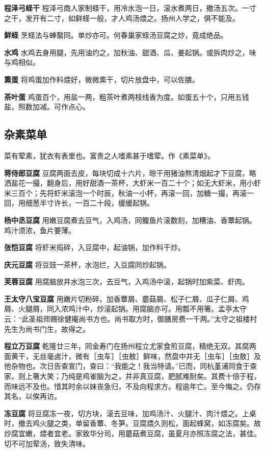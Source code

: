 \documentclass[]{article}
\begin{document}
\textbf{程泽弓蛏干}
程泽弓商人家制蛏干，用冷水泡一日，滚水煮两日，撤汤五次。一寸之干，发开有二寸，如鲜蛏一般，才人鸡汤煨之。扬州人学之，俱不能及。

\textbf{鲜蛏} 烹蛏法与蛼螯同。单炒亦可。何春巢家蛏汤豆腐之炒，竟成绝品。

\textbf{水鸡}
水鸡去身用腿，先用油灼之，加秋油、甜酒、瓜、姜起锅。或拆肉炒之，味与鸡相似。

\textbf{熏蛋} 将鸡蛋加作料煨好，微微熏干，切片放盘中，可以佐膳。

\textbf{茶叶蛋}
鸡蛋百个，用盐一两，粗茶叶煮两枝线香为度。如蛋五十个，只用五钱盐，照数加减。可作点心。

\hypertarget{header-n27}{%
\subsection{杂素菜单}\label{header-n27}}

菜有荤素，犹衣有表里也。富贵之人嗜素甚于嗜荤。作《素菜单》。

\textbf{蒋侍郎豆腐}
豆腐两面去皮，每块切成十六片，晾干用猪油熬清烟起才下豆腐，略洒盐花一撮，翻身后，用好甜酒一茶杯，大虾米一百二十个；如无大虾米，用小虾米三百个；先将虾米滚泡一个时辰，秋油一小杯，再滚一回，加糖一撮，再滚一回，用细葱半寸许长，一百二十段，缓缓起锅。

\textbf{杨中丞豆腐}
用嫩豆腐煮去豆气，入鸡汤，同鳆鱼片滚数刻，加糟油、香蕈起锅。鸡汁须浓，鱼片要薄。

\textbf{张恺豆腐} 将虾米捣碎，入豆腐中，起油锅，加作料干炒。

\textbf{庆元豆腐} 将豆豉一茶杯，水泡烂，入豆腐同炒起锅。

\textbf{芙蓉豆腐}
用腐脑放井水泡三次，去豆气，入鸡汤中滚，起锅时加紫菜、虾肉。

\textbf{王太守八宝豆腐}
用嫩片切粉碎，加香蕈屑、蘑菇屑、松子仁屑、瓜子仁屑、鸡屑、火腿屑，同入浓鸡汁中，炒滚起锅。用腐脑亦可。用瓢不用箸。孟亭太守云：``此圣祖师赐徐健庵尚书方也。尚书取方时，御膳房费一千两。''太守之祖楼村先生为尚书门生，故得之。

\textbf{程立万豆腐}
乾隆廿三年，同金寿门在扬州程立尤家食煎豆腐，精绝无双。其腐两面黄干，无丝毫卤汁，微有［虫车］［虫敖］鲜味，然盘中并无［虫车］［虫敖］及他杂物也。次日告查宣门，查曰：``我能之！我当特请。''已而，同杭堇浦同食于查家，则上箸大笑；乃纯是鸡雀脑为之，并非真豆腐，肥腻难耐矣。其费十倍于程，而味远不及也。惜其时余以妹丧急归，不及向程求方。程逾年亡。至今悔之。仍存其名，以俟再访。

\textbf{冻豆腐}
将豆腐冻一夜，切方块，滚去豆味，加鸡汤汁、火腿汁、肉汁煨之。上桌时，撤去鸡火腿之类，单留香蕈、冬笋。豆腐煨久则松，面起蜂窝，如冻腐矣。故炒腐宜嫩，煨者宜老。家致华分司，用蘑菇煮豆腐，虽夏月亦照冻腐之法，甚佳。切不可加荤汤，致失清味。
\end{document}
